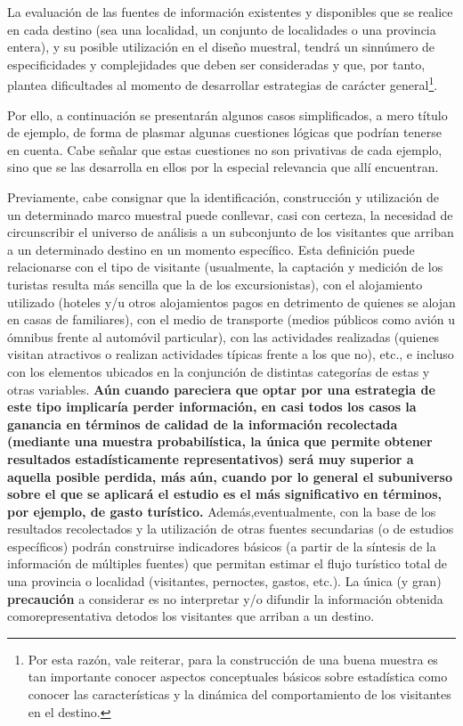 \documentclass[
]{book}
\begin{document}
La evaluación de las fuentes de información existentes y disponibles que se realice en cada destino (sea una localidad, un conjunto de localidades o una provincia entera), y su posible utilización en el diseño muestral, tendrá un sinnúmero de especificidades y complejidades que deben ser consideradas y que, por tanto, plantea dificultades al momento de desarrollar estrategias de carácter general\footnote{Por esta razón, vale reiterar, para la construcción de una buena muestra es tan importante conocer aspectos conceptuales básicos sobre estadística como conocer las características y la dinámica del comportamiento de los visitantes en el destino.}.

Por ello, a continuación se presentarán algunos casos simplificados, a mero título de ejemplo, de forma de plasmar algunas cuestiones lógicas que podrían tenerse en cuenta. Cabe señalar que estas cuestiones no son privativas de cada ejemplo, sino que se las desarrolla en ellos por la especial relevancia que allí encuentran.

Previamente, cabe consignar que la identificación, construcción y utilización de un determinado marco muestral puede conllevar, casi con certeza, la necesidad de circunscribir el universo de análisis a un subconjunto de los visitantes que arriban a un determinado destino en un momento específico. Esta definición puede relacionarse con el tipo de visitante (usualmente, la captación y medición de los turistas resulta más sencilla que la de los excursionistas), con el alojamiento utilizado (hoteles y/u otros alojamientos pagos en detrimento de quienes se alojan en casas de familiares), con el medio de transporte (medios públicos como avión u ómnibus frente al automóvil particular), con las actividades realizadas (quienes visitan atractivos o realizan actividades típicas frente a los que no), etc., e incluso con los elementos ubicados en la conjunción de distintas categorías de estas y otras variables. \textbf{Aún cuando pareciera que optar por una estrategia de este tipo implicaría perder información, en casi todos los casos la ganancia en términos de calidad de la información recolectada (mediante una muestra probabilística, la única que permite obtener resultados estadísticamente representativos) será muy superior a aquella posible perdida, más aún, cuando por lo general el subuniverso sobre el que se aplicará el estudio es el más significativo en términos, por ejemplo, de gasto turístico.} Además,eventualmente, con la base de los resultados recolectados y la utilización de otras fuentes secundarias (o de estudios específicos) podrán construirse indicadores básicos (a partir de la síntesis de la información de múltiples fuentes) que permitan estimar el flujo turístico total de una provincia o localidad (visitantes, pernoctes, gastos, etc.). La única (y gran) \textbf{precaución} a considerar es no interpretar y/o difundir la información obtenida comorepresentativa detodos los visitantes que arriban a un destino.
\end{document}
